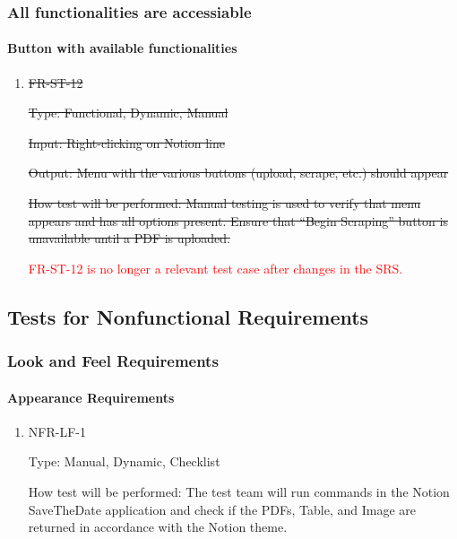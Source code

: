 \documentclass[12pt, titlepage]{article}
\begin{document}
\subsubsection{All functionalities are accessiable}

\paragraph{Button with available functionalities}

\begin{enumerate}

\item{\sout{FR-ST-12}\\}

\sout{Type: Functional, Dynamic, Manual} 

\sout{Input: Right-clicking on Notion line}

\sout{Output: Menu with the various buttons (upload, scrape, etc.) should appear}

\sout{How test will be performed: Manual testing is used to verify that menu appears and has all options present. Ensure that “Begin Scraping” button is unavailable until a PDF is uploaded.}

\textcolor{red}{FR-ST-12 is no longer a relevant test case after changes in the SRS.}

\end{enumerate}

\subsection{Tests for Nonfunctional Requirements}

\subsubsection{Look and Feel Requirements}
		
\paragraph{Appearance Requirements}

\begin{enumerate}

\item{NFR-LF-1\\}

Type: Manual, Dynamic, Checklist 

How test will be performed: The test team will run commands in the Notion SaveTheDate application and check if the PDFs, Table, and Image are returned in accordance with the Notion theme. 

\end{enumerate}
\end{document}
